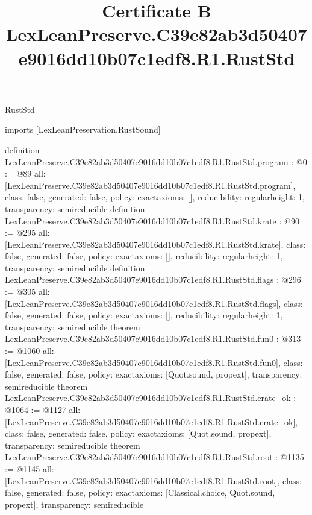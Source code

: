 \begin{lexlean}{RustStd}
\title{Certificate B LexLeanPreserve.C39e82ab3d50407e9016dd10b07c1edf8.R1.RustStd}
\begin{coremodule}
imports [LexLeanPreservation.RustSound]

definition LexLeanPreserve.C39e82ab3d50407e9016dd10b07c1edf8.R1.RustStd.program : @0 := @89 {
  all: [LexLeanPreserve.C39e82ab3d50407e9016dd10b07c1edf8.R1.RustStd.program],
  class: false,
  generated: false,
  policy: exact{axioms: []},
  reducibility: regular{height: 1},
  transparency: semireducible
}
definition LexLeanPreserve.C39e82ab3d50407e9016dd10b07c1edf8.R1.RustStd.krate : @90 := @295 {
  all: [LexLeanPreserve.C39e82ab3d50407e9016dd10b07c1edf8.R1.RustStd.krate],
  class: false,
  generated: false,
  policy: exact{axioms: []},
  reducibility: regular{height: 1},
  transparency: semireducible
}
definition LexLeanPreserve.C39e82ab3d50407e9016dd10b07c1edf8.R1.RustStd.flags : @296 := @305 {
  all: [LexLeanPreserve.C39e82ab3d50407e9016dd10b07c1edf8.R1.RustStd.flags],
  class: false,
  generated: false,
  policy: exact{axioms: []},
  reducibility: regular{height: 1},
  transparency: semireducible
}
theorem LexLeanPreserve.C39e82ab3d50407e9016dd10b07c1edf8.R1.RustStd.fun0 : @313 := @1060 {
  all: [LexLeanPreserve.C39e82ab3d50407e9016dd10b07c1edf8.R1.RustStd.fun0],
  class: false,
  generated: false,
  policy: exact{axioms: [Quot.sound, propext]},
  transparency: semireducible
}
theorem LexLeanPreserve.C39e82ab3d50407e9016dd10b07c1edf8.R1.RustStd.crate_ok : @1064 := @1127 {
  all: [LexLeanPreserve.C39e82ab3d50407e9016dd10b07c1edf8.R1.RustStd.crate_ok],
  class: false,
  generated: false,
  policy: exact{axioms: [Quot.sound, propext]},
  transparency: semireducible
}
theorem LexLeanPreserve.C39e82ab3d50407e9016dd10b07c1edf8.R1.RustStd.root : @1135 := @1145 {
  all: [LexLeanPreserve.C39e82ab3d50407e9016dd10b07c1edf8.R1.RustStd.root],
  class: false,
  generated: false,
  policy: exact{axioms: [Classical.choice, Quot.sound, propext]},
  transparency: semireducible
}


\end{coremodule}
\end{lexlean}
